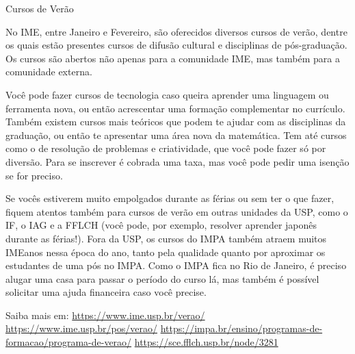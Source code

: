 \begin{secao}{Cursos de Verão}

No IME, entre Janeiro e Fevereiro, são oferecidos diversos cursos de verão,
dentre os quais estão presentes cursos de difusão cultural e disciplinas de
pós-graduação. Os cursos são abertos não apenas para a comunidade IME, mas
também para a comunidade externa.

Você pode fazer cursos de tecnologia caso queira aprender uma linguagem ou 
ferramenta nova, ou então acrescentar uma formação complementar no currículo. 
Também existem cursos mais teóricos que podem te ajudar com as disciplinas da 
graduação, ou então te apresentar uma área nova da matemática. Tem até cursos como
o de resolução de problemas e criatividade, que você pode fazer só por diversão. 
Para se inscrever é cobrada uma taxa, mas você pode pedir uma isenção se for preciso. 

Se vocês estiverem muito empolgados durante as férias ou sem ter o que fazer, 
fiquem atentos também para cursos de verão em outras unidades da USP, como o IF, o IAG 
e a FFLCH (você pode, por exemplo, resolver aprender japonês durante as férias!). Fora da 
USP, os cursos do IMPA também atraem muitos IMEanos nessa época do ano, tanto pela qualidade 
quanto por aproximar os estudantes de uma pós no IMPA. Como o IMPA fica no Rio de Janeiro, 
é preciso alugar uma casa para passar o período do curso lá, mas também é possível solicitar 
uma ajuda financeira caso você precise.


Saiba mais em: 
\url{https://www.ime.usp.br/verao/}
\url{https://www.ime.usp.br/pos/verao/}
\url{https://impa.br/ensino/programas-de-formacao/programa-de-verao/}
\url{https://sce.fflch.usp.br/node/3281}

\end{secao}
